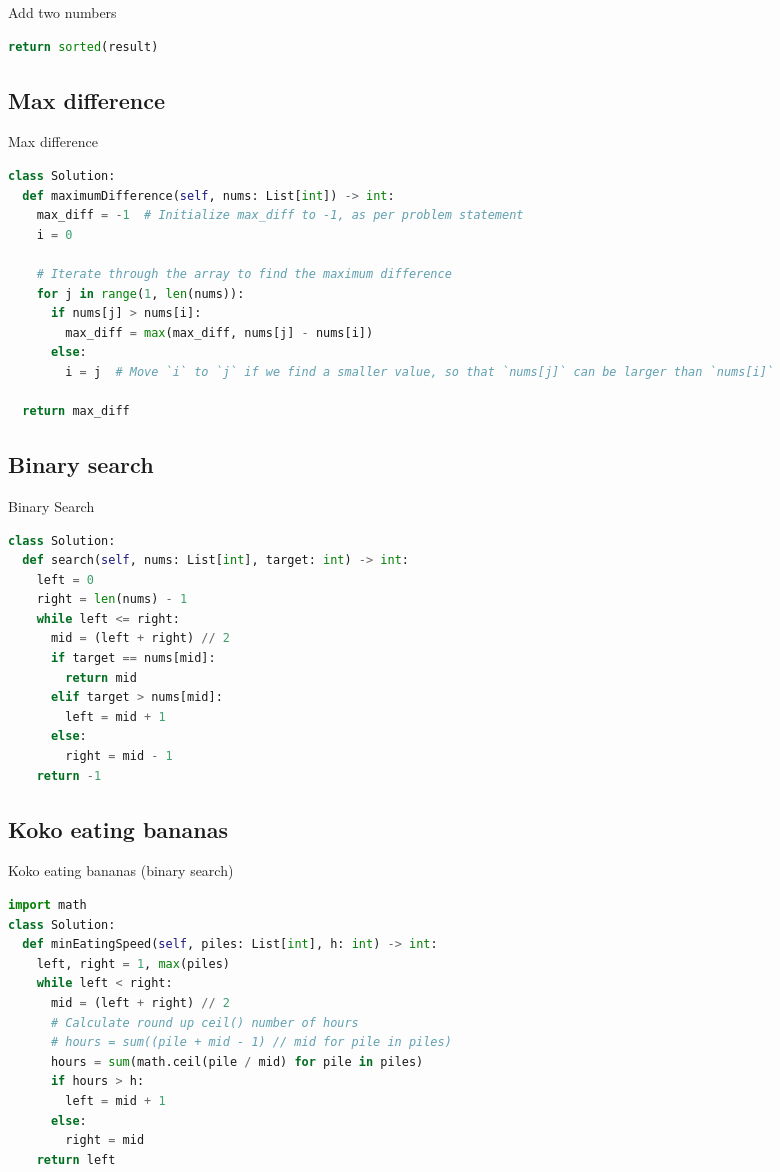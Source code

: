 \documentclass[a4paper,12pt]{article}
\begin{document}
\begin{multicols}{2}
\begin{mycode}[label={lst:add-two-numbers}]{Add two numbers}
\begin{lstlisting}[language=Python]
    return sorted(result)
\end{lstlisting}
\end{mycode}

\subsection{Max difference}

\begin{mycode}[label={lst:max-difference}]{Max difference}
\begin{lstlisting}[language=Python]
class Solution:
  def maximumDifference(self, nums: List[int]) -> int:
    max_diff = -1  # Initialize max_diff to -1, as per problem statement
    i = 0
    
    # Iterate through the array to find the maximum difference
    for j in range(1, len(nums)):
      if nums[j] > nums[i]:
        max_diff = max(max_diff, nums[j] - nums[i])
      else:
        i = j  # Move `i` to `j` if we find a smaller value, so that `nums[j]` can be larger than `nums[i]`
    
  return max_diff
\end{lstlisting}
\end{mycode}

\subsection{Binary search}
\begin{mycode}[label={lst:binary-search}]{Binary Search}
\begin{lstlisting}[language=Python]
class Solution:
  def search(self, nums: List[int], target: int) -> int:
    left = 0
    right = len(nums) - 1
    while left <= right:
      mid = (left + right) // 2
      if target == nums[mid]:
        return mid 
      elif target > nums[mid]:
        left = mid + 1
      else:
        right = mid - 1
    return -1
\end{lstlisting}
\end{mycode}

\subsection{Koko eating bananas}
\begin{mycode}[label={lst:koko-eating-bananas}]{Koko eating bananas (binary search)}
\begin{lstlisting}[language=Python]
import math
class Solution:
  def minEatingSpeed(self, piles: List[int], h: int) -> int:
    left, right = 1, max(piles)
    while left < right:
      mid = (left + right) // 2
      # Calculate round up ceil() number of hours
      # hours = sum((pile + mid - 1) // mid for pile in piles)
      hours = sum(math.ceil(pile / mid) for pile in piles)
      if hours > h:
        left = mid + 1
      else:
        right = mid
    return left
\end{lstlisting}
\end{mycode}


\end{multicols}
\end{document}

